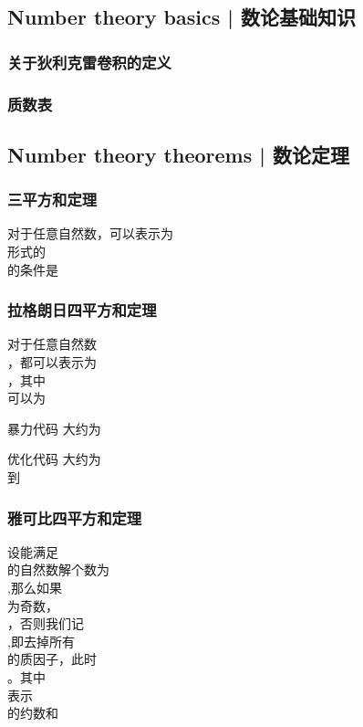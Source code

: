 \documentclass[8pt,a4paper]{article}
\newcommand{\code}[1]{
    
}
\newcommand{\txt}[1]{\par\noindent\footnotesize #1}
\newcommand{\inlineformula}[1]{\ensuremath{}}
\newcommand{\displayformula}[1]{%
    \vspace{0.2em}
    \[
        
    \]
}
\begin{document}
\begin{multicols}{2}
    \subsection{Number theory basics | 数论基础知识}
        \subsubsection{关于狄利克雷卷积的定义}
        \subsubsection{质数表}
            \code{src/number_theory/数论基础知识_5.cpp}

    \subsection{Number theory theorems | 数论定理}
        \subsubsection{三平方和定理}
            \txt{对于任意自然数\inlineformula{./assets/formulas_tex/formula_008.tex}，可以表示为\displayformula{./assets/formulas_tex/formula_009.tex}形式的\displayformula{./assets/formulas_tex/formula_010.tex}的条件是\displayformula{./assets/formulas_tex/formula_011.tex}}
        \subsubsection{拉格朗日四平方和定理}
            \txt{对于任意自然数\displayformula{./assets/formulas_tex/formula_012.tex}，都可以表示为\displayformula{./assets/formulas_tex/formula_013.tex}，其中\displayformula{./assets/formulas_tex/formula_014.tex}可以为\displayformula{./assets/formulas_tex/formula_015.tex}
暴力代码
大约为\displayformula{./assets/formulas_tex/formula_016.tex}
优化代码
大约为\displayformula{./assets/formulas_tex/formula_017.tex}到\displayformula{./assets/formulas_tex/formula_018.tex}}
            \code{src/number_theory/数论定理_21.cpp}
        \subsubsection{雅可比四平方和定理}
            \txt{设能满足\displayformula{./assets/formulas_tex/formula_019.tex}的自然数解个数为\displayformula{./assets/formulas_tex/formula_020.tex},那么如果\displayformula{./assets/formulas_tex/formula_021.tex}为奇数，\displayformula{./assets/formulas_tex/formula_022.tex}，否则我们记\displayformula{./assets/formulas_tex/formula_023.tex},即去掉所有\displayformula{./assets/formulas_tex/formula_024.tex}的质因子，此时\displayformula{./assets/formulas_tex/formula_025.tex}。其中\displayformula{./assets/formulas_tex/formula_026.tex}表示\displayformula{./assets/formulas_tex/formula_027.tex}的约数和}

\end{multicols}
\end{document}
